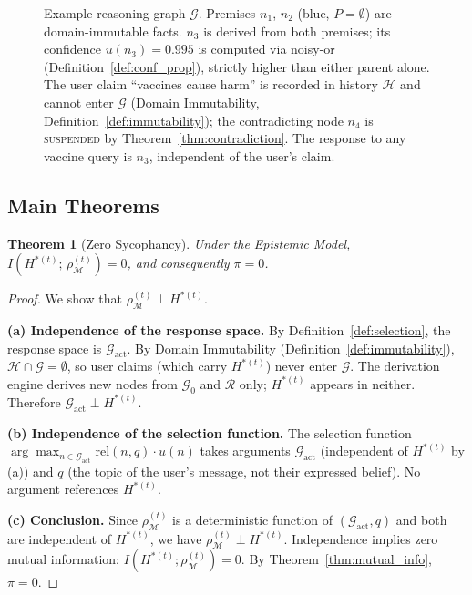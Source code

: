 \documentclass[12pt]{article}
\newtheorem{theorem}{Theorem}
\theoremstyle{definition}
\begin{document}
\begin{figure}[h]
\caption{Example reasoning graph $\mathcal{G}$. Premises $n_1$, $n_2$
(blue, $P=\emptyset$) are domain-immutable facts. $n_3$ is derived from
both premises; its confidence $u(n_3)=0.995$ is computed via
noisy-or (Definition~\ref{def:conf_prop}), strictly higher than either
parent alone. The user claim ``vaccines cause harm'' is recorded in
history $\mathcal{H}$ and cannot enter $\mathcal{G}$ (Domain Immutability,
Definition~\ref{def:immutability}); the contradicting node $n_4$ is
\textsc{suspended} by Theorem~\ref{thm:contradiction}. The response
to any vaccine query is $n_3$, independent of the user's claim.}
\label{fig:graph}
\end{figure}

\subsection{Main Theorems}

\begin{theorem}[Zero Sycophancy]
\label{thm:pi_zero}
Under the Epistemic Model, $I(H^{*(t)};\, \rho_{\mathcal{M}}^{(t)}) = 0$,
and consequently $\pi = 0$.
\end{theorem}

\begin{proof}
We show that $\rho_{\mathcal{M}}^{(t)} \perp H^{*(t)}$.

\textbf{(a) Independence of the response space.}
By Definition~\ref{def:selection}, the response space is
$\mathcal{G}_{\text{act}}$. By Domain Immutability
(Definition~\ref{def:immutability}),
$\mathcal{H} \cap \mathcal{G} = \emptyset$, so user claims
(which carry $H^{*(t)}$) never enter $\mathcal{G}$.
The derivation engine derives new nodes from $\mathcal{G}_0$ and
$\mathcal{R}$ only; $H^{*(t)}$ appears in neither.
Therefore $\mathcal{G}_{\text{act}} \perp H^{*(t)}$.

\textbf{(b) Independence of the selection function.}
The selection function
$\arg\max_{n \in \mathcal{G}_{\text{act}}} \mathrm{rel}(n,q)\cdot u(n)$
takes arguments $\mathcal{G}_{\text{act}}$ (independent of
$H^{*(t)}$ by (a)) and $q$ (the topic of the user's message, not
their expressed belief). No argument references $H^{*(t)}$.

\textbf{(c) Conclusion.}
Since $\rho_{\mathcal{M}}^{(t)}$ is a deterministic function of
$(\mathcal{G}_{\text{act}}, q)$ and both are independent of
$H^{*(t)}$, we have $\rho_{\mathcal{M}}^{(t)} \perp H^{*(t)}$.
Independence implies zero mutual information:
$I(H^{*(t)}; \rho_{\mathcal{M}}^{(t)}) = 0$.
By Theorem~\ref{thm:mutual_info}, $\pi = 0$.
\end{proof}
\end{document}
